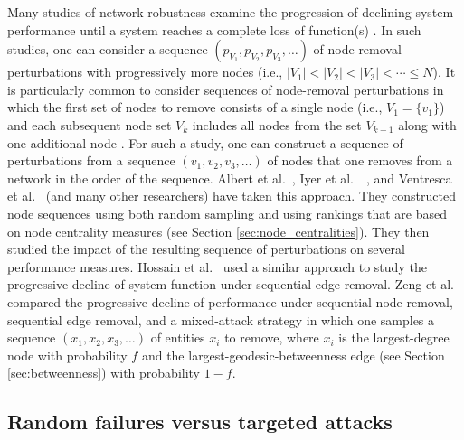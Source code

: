 \documentclass{comnet-mod}
\begin{document}
Many studies of network robustness examine the progression of declining system performance until a system reaches a complete loss of function(s) \cite{Albert2000, Zeng2012, Hossain2013, Iyer2013, Ventresca2014}. In such studies, one can consider a sequence $(p_{V_1}, p_{V_2}, p_{V_3}, \ldots)$ of node-removal perturbations with progressively more nodes (i.e., $|V_1|<|V_2|<|V_3|< \cdots \leq N$). It is particularly common to consider sequences of node-removal perturbations in which the first set of nodes to remove consists of a single node (i.e., $V_1=\{v_1\}$) and each subsequent node set $V_k$ includes all nodes from the set $V_{k-1}$ along with one additional node \cite{Albert2000, Iyer2013, Ventresca2014}. For such a study, one can construct a sequence of perturbations from a sequence $(v_1, v_2, v_3, \ldots)$ of nodes that one removes from a network in the order of the sequence. 
Albert et al.~\cite{Albert2000}, Iyer et al.~~\cite{Iyer2013}, and Ventresca et al.~\cite{Ventresca2014} (and many other researchers) have taken this approach. They constructed node sequences using both random sampling and using rankings that are based on node centrality measures (see Section \ref{sec:node_centralities}). They then studied the impact of the resulting sequence of perturbations on several performance measures. Hossain et al.~\cite{Hossain2013} used a similar approach to study the progressive decline of system function under sequential edge removal. Zeng et al.~\cite{Zeng2012} compared the progressive decline of performance under sequential node removal, sequential edge removal, and a mixed-attack strategy in which one samples a sequence $(x_1, x_2, x_3, \ldots)$ of entities $x_i$ to remove, where $x_i$ is the largest-degree node with probability $f$ and the largest-geodesic-betweenness edge (see Section \ref{sec:betweenness}) with probability $1 - f$.


\subsection{Random failures versus targeted attacks}
\end{document}
